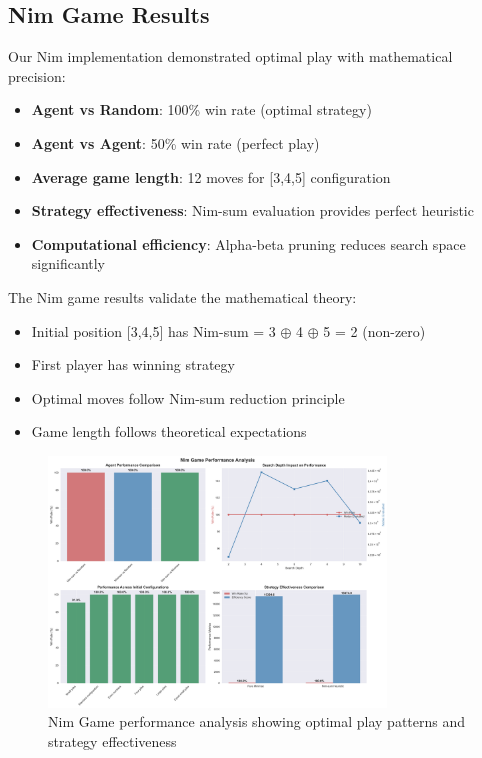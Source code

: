 \documentclass[12pt]{article}
\begin{document}
\subsection{Nim Game Results}

Our Nim implementation demonstrated optimal play with mathematical precision:
\begin{itemize}
    \item \textbf{Agent vs Random}: 100\% win rate (optimal strategy)
    \item \textbf{Agent vs Agent}: 50\% win rate (perfect play)
    \item \textbf{Average game length}: 12 moves for [3,4,5] configuration
    \item \textbf{Strategy effectiveness}: Nim-sum evaluation provides perfect heuristic
    \item \textbf{Computational efficiency}: Alpha-beta pruning reduces search space significantly
\end{itemize}

The Nim game results validate the mathematical theory:
\begin{itemize}
    \item Initial position [3,4,5] has Nim-sum = 3 $\oplus$ 4 $\oplus$ 5 = 2 (non-zero)
    \item First player has winning strategy
    \item Optimal moves follow Nim-sum reduction principle
    \item Game length follows theoretical expectations
\end{itemize}

\begin{figure}[H]
\centering
\includegraphics[width=0.8\textwidth]{output/images/nim_performance_analysis.png}
\caption{Nim Game performance analysis showing optimal play patterns and strategy effectiveness}
\label{fig:nim_performance}
\end{figure}
\end{document}
